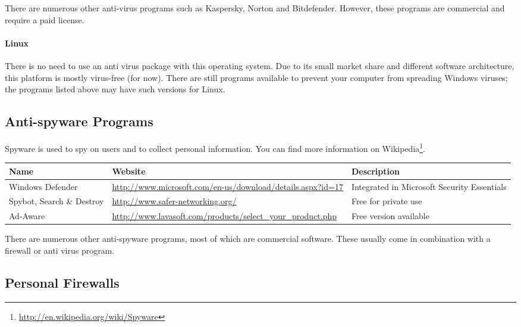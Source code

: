 \documentclass[a4paper,12pt]{scrartcl}
\begin{document}
There are numerous other anti-virus programs such as Kaspersky, Norton and Bitdefender. However, these programs are commercial and require a paid license.

\paragraph*{Linux}

There is no need to use an anti virus package with this operating system. Due to its small market share and different software architecture, this platform is mostly virus-free (for now). There are still programs available to prevent your computer from spreading Windows viruses; the programs listed above may have such versions for Linux.

\pagebreak

\subsection*{Anti-spyware Programs}

Spyware is used to spy on users and to collect personal information. You can find more information on Wikipedia\footnote{\url{http://en.wikipedia.org/wiki/Spyware}}.

\begin{center}
  \begin{tabularx}{\linewidth}{|p{.18\linewidth}Xp{.3\linewidth}|}
    \hline
    Name & Website & Description\\
    \hline \hline
    Windows Defender & \url{http://www.microsoft.com/en-us/download/details.aspx?id=17} & Integrated in Microsoft Security Essentials\\
    \hline
    Spybot, Search \& Destroy & \url{http://www.safer-networking.org/} & Free for private use\\
    \hline
    Ad-Aware & \url{http://www.lavasoft.com/products/select\_your\_product.php} & Free version available\\
    \hline
  \end{tabularx}
\end{center}

There are numerous other anti-spyware programs, most of which are commercial software. These usually come in combination with a firewall or anti virus program.

\subsection*{Personal Firewalls}
\end{document}
